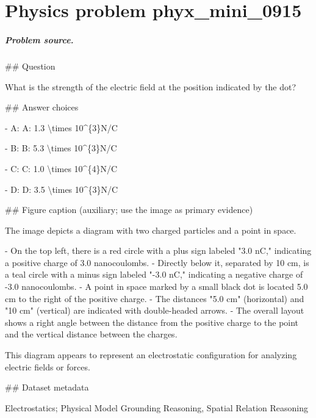 
\chapter{Physics problem phyx\_mini\_0915}
\label{ch:PhyXMiniProblems_problem_phyx_mini_0915}

\paragraph{Problem source.}
\#\# Question

What is the strength of the electric field at the position indicated by the dot?

\#\# Answer choices

- A: A: 1.3 \textbackslash{}times 10\textasciicircum{}\{3\}N/C

- B: B: 5.3 \textbackslash{}times 10\textasciicircum{}\{3\}N/C

- C: C: 1.0 \textbackslash{}times 10\textasciicircum{}\{4\}N/C

- D: D: 3.5 \textbackslash{}times 10\textasciicircum{}\{3\}N/C

\#\# Figure caption (auxiliary; use the image as primary evidence)

The image depicts a diagram with two charged particles and a point in space. 

- On the top left, there is a red circle with a plus sign labeled "3.0 nC," indicating a positive charge of 3.0 nanocoulombs.
- Directly below it, separated by 10 cm, is a teal circle with a minus sign labeled "-3.0 nC," indicating a negative charge of -3.0 nanocoulombs.
- A point in space marked by a small black dot is located 5.0 cm to the right of the positive charge.
- The distances "5.0 cm" (horizontal) and "10 cm" (vertical) are indicated with double-headed arrows.
- The overall layout shows a right angle between the distance from the positive charge to the point and the vertical distance between the charges.

This diagram appears to represent an electrostatic configuration for analyzing electric fields or forces.

\#\# Dataset metadata

Electrostatics; Physical Model Grounding Reasoning, Spatial Relation Reasoning

